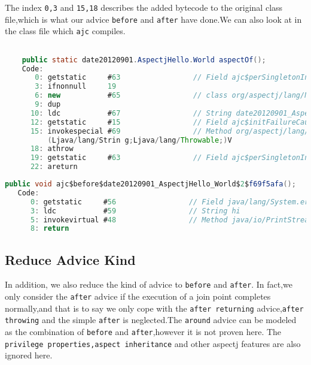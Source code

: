 The index \texttt{0,3} and \texttt{15,18} describes the added bytecode to the original class file,which is what our advice \texttt{before} and \texttt{after} have done.We can also look at in the class file which \texttt{ajc} compiles.

\begin{lstlisting}[language=java,caption=aspectOf() in World class file]

    public static date20120901.AspectjHello.World aspectOf();
    Code:
       0: getstatic     #63                 // Field ajc$perSingletonInstance:Ldate20120901/AspectjHello/World;
       3: ifnonnull     19
       6: new           #65                 // class org/aspectj/lang/NoAspectBoundException
       9: dup
      10: ldc           #67                 // String date20120901_AspectjHello_World
      12: getstatic     #15                 // Field ajc$initFailureCause:Ljava/lang/Throwable;
      15: invokespecial #69                 // Method org/aspectj/lang/NoAspectBoundException."<init>":
          (Ljava/lang/Strin g;Ljava/lang/Throwable;)V
      18: athrow
      19: getstatic     #63                 // Field ajc$perSingletonInstance:Ldate20120901/AspectjHello/World;
      22: areturn
\end{lstlisting}

\begin{lstlisting}[language=java,caption=before advice in World class file]
   public void ajc$before$date20120901_AspectjHello_World$2$f69f5afa();
   Code:
      0: getstatic     #56                 // Field java/lang/System.err:Ljava/io/PrintStream;
      3: ldc           #59                 // String hi
      5: invokevirtual #48                 // Method java/io/PrintStream.println:(Ljava/lang/String;)V
      8: return
\end{lstlisting}



\subsection{Reduce Advice Kind}
In addition, we also reduce the kind of advice to \texttt{before} and \texttt{after}. In fact,we only consider the \texttt{after} advice if the execution of a join point completes normally,and that is to say we only cope with the \texttt{after returning} advice,\texttt{after throwing} and the simple \texttt{after} is neglected.The \texttt{around} advice can be modeled as the combination of \texttt{before} and \texttt{after},however it is not proven here.
The \texttt{privilege properties,aspect inheritance} and other aspectj features are also ignored here.